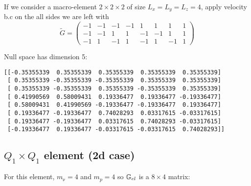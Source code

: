 If we consider a macro-element $2\times 2 \times 2$ of size $L_x=L_y=L_z=4$, apply velocity b.c on the all sides
we are left with
\[
\tilde{G} = 
\left(
\begin{array}{cccccccc}
-1 &-1 &-1 &-1 & 1 & 1 & 1 & 1\\
-1 &-1 & 1 & 1 &-1 &-1 & 1 & 1\\
-1 & 1 &-1 & 1 &-1 & 1 &-1 & 1
\end{array}
\right)
\]

Null space has dimension 5:
\begin{verbatim}
[[-0.35355339  0.35355339  0.35355339  0.35355339  0.35355339]
 [ 0.35355339 -0.35355339 -0.35355339  0.35355339  0.35355339]
 [ 0.35355339 -0.35355339  0.35355339 -0.35355339  0.35355339]
 [ 0.41990569  0.58009431  0.19336477  0.19336477 -0.19336477]
 [ 0.58009431  0.41990569 -0.19336477 -0.19336477  0.19336477]
 [ 0.19336477 -0.19336477  0.74028293  0.03317615 -0.03317615]
 [ 0.19336477 -0.19336477  0.03317615  0.74028293 -0.03317615]
 [-0.19336477  0.19336477 -0.03317615 -0.03317615  0.74028293]]
\end{verbatim}



\subsection{$Q_1\times Q_1$ element (2d case)}

For this element, $m_\upnu=4$ and $m_p=4$ so ${\mathbb{G}}_{el}$ is a $8\times 4$ matrix:

